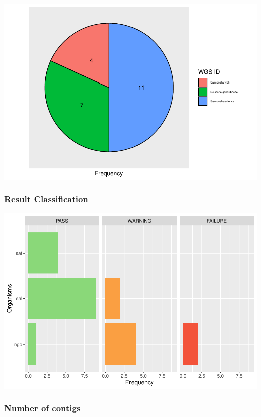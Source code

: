 \documentclass[
  a4paper,
]{article}
\begin{document}
\includegraphics{qualifyr_report_2024-08-02_files/figure-latex/pie_chart-1.pdf}

\subsubsection{Result Classification}\label{result-classification}

\includegraphics{qualifyr_report_2024-08-02_files/figure-latex/organism results-1.pdf}

\subsubsection{Number of contigs}\label{number-of-contigs}
\end{document}
